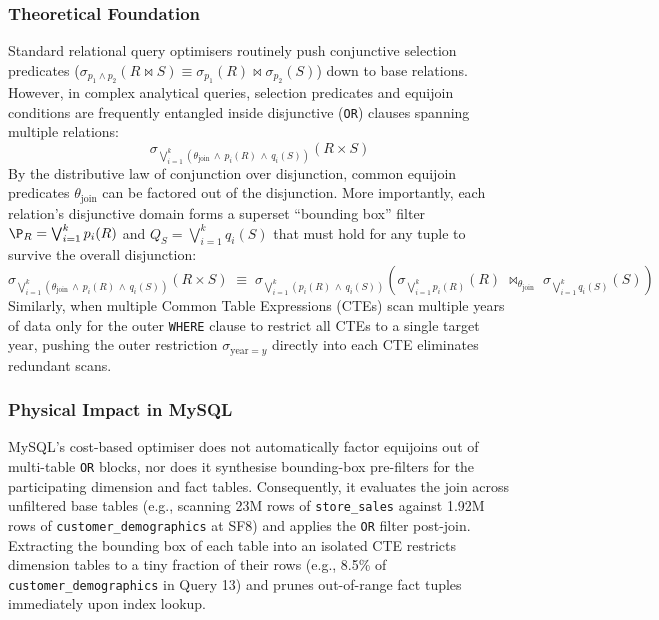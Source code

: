 \documentclass{ULBreport}
\begin{document}
\subsubsection{Theoretical Foundation}
Standard relational query optimisers routinely push conjunctive selection predicates ($\sigma_{p_1 \land p_2}(R \bowtie S) \equiv \sigma_{p_1}(R) \bowtie \sigma_{p_2}(S)$) down to base relations. However, in complex analytical queries, selection predicates and equijoin conditions are frequently entangled inside disjunctive (\texttt{OR}) clauses spanning multiple relations:
\begin{equation}
\sigma_{\bigvee_{i=1}^{k} \left(\theta_{\text{join}} \,\land\, p_i(R) \,\land\, q_i(S)\right)}(R \times S)
\end{equation}
By the distributive law of conjunction over disjunction, common equijoin predicates $\theta_{\text{join}}$ can be factored out of the disjunction. More importantly, each relation's disjunctive domain forms a superset ``bounding box'' filter $\P_R = \bigvee_{i=1}^{k} p_i(R)$ and $Q_S = \bigvee_{i=1}^{k} q_i(S)$ that must hold for any tuple to survive the overall disjunction:
\begin{equation}
\sigma_{\bigvee_{i=1}^{k} \left(\theta_{\text{join}} \,\land\, p_i(R) \,\land\, q_i(S)\right)}(R \times S) \;\equiv\; \sigma_{\bigvee_{i=1}^{k} \left(p_i(R) \,\land\, q_i(S)\right)}\left( \sigma_{\bigvee_{i=1}^{k} p_i(R)}(R) \;\bowtie_{\theta_{\text{join}}}\; \sigma_{\bigvee_{i=1}^{k} q_i(S)}(S) \right)
\end{equation}
Similarly, when multiple Common Table Expressions (CTEs) scan multiple years of data only for the outer \texttt{WHERE} clause to restrict all CTEs to a single target year, pushing the outer restriction $\sigma_{\text{year}=y}$ directly into each CTE eliminates redundant scans.

\subsubsection{Physical Impact in MySQL}
MySQL's cost-based optimiser does not automatically factor equijoins out of multi-table \texttt{OR} blocks, nor does it synthesise bounding-box pre-filters for the participating dimension and fact tables. Consequently, it evaluates the join across unfiltered base tables (e.g., scanning 23M rows of \texttt{store\_sales} against 1.92M rows of \texttt{customer\_demographics} at SF8) and applies the \texttt{OR} filter post-join. Extracting the bounding box of each table into an isolated CTE restricts dimension tables to a tiny fraction of their rows (e.g., 8.5\% of \texttt{customer\_demographics} in Query 13) and prunes out-of-range fact tuples immediately upon index lookup.
\end{document}

